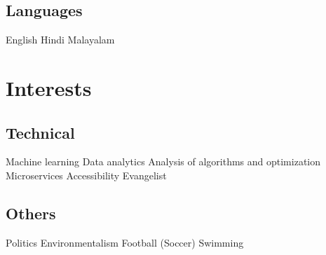 \documentclass[]{deedy-resume-openfont}
\begin{document}
\begin{minipage}[t]{0.33\textwidth}
\subsection{Languages}
English \textbullet{} Hindi \textbullet{} Malayalam
\sectionsep


\section{Interests}
\subsection{Technical}
Machine learning \textbullet{} Data analytics \textbullet{} Analysis of algorithms and optimization \textbullet{} Microservices
\textbullet{} Accessibility Evangelist 

\vspace{\topsep}
\subsection{Others}
Politics \textbullet{} Environmentalism \textbullet{} Football (Soccer) \textbullet{} Swimming
\sectionsep



%
%

\end{minipage} 
\hfill
\end{document}
